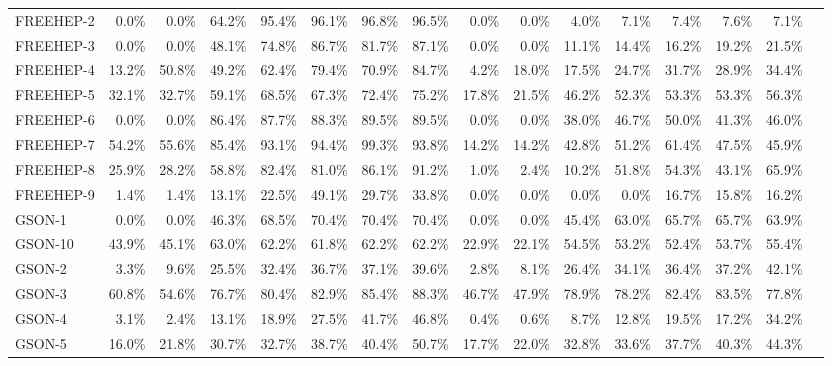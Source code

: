 \begin{tabular}{ l rrrrrrr rrrrrrrr}
FREEHEP-2 &  0.0\% &  0.0\% &  64.2\% &  95.4\% &  96.1\% &  96.8\% &  96.5\% &  0.0\% &  0.0\% &  4.0\% &  7.1\% &  7.4\% &  7.6\% &  7.1\%\\ 
FREEHEP-3 &  0.0\% &  0.0\% &  48.1\% &  74.8\% &  86.7\% &  81.7\% &  87.1\% &  0.0\% &  0.0\% &  11.1\% &  14.4\% &  16.2\% &  19.2\% &  21.5\%\\ 
FREEHEP-4 &  13.2\% &  50.8\% &  49.2\% &  62.4\% &  79.4\% &  70.9\% &  84.7\% &  4.2\% &  18.0\% &  17.5\% &  24.7\% &  31.7\% &  28.9\% &  34.4\%\\ 
FREEHEP-5 &  32.1\% &  32.7\% &  59.1\% &  68.5\% &  67.3\% &  72.4\% &  75.2\% &  17.8\% &  21.5\% &  46.2\% &  52.3\% &  53.3\% &  53.3\% &  56.3\%\\ 
FREEHEP-6 &  0.0\% &  0.0\% &  86.4\% &  87.7\% &  88.3\% &  89.5\% &  89.5\% &  0.0\% &  0.0\% &  38.0\% &  46.7\% &  50.0\% &  41.3\% &  46.0\%\\ 
FREEHEP-7 &  54.2\% &  55.6\% &  85.4\% &  93.1\% &  94.4\% &  99.3\% &  93.8\% &  14.2\% &  14.2\% &  42.8\% &  51.2\% &  61.4\% &  47.5\% &  45.9\%\\ 
FREEHEP-8 &  25.9\% &  28.2\% &  58.8\% &  82.4\% &  81.0\% &  86.1\% &  91.2\% &  1.0\% &  2.4\% &  10.2\% &  51.8\% &  54.3\% &  43.1\% &  65.9\%\\ 
FREEHEP-9 &  1.4\% &  1.4\% &  13.1\% &  22.5\% &  49.1\% &  29.7\% &  33.8\% &  0.0\% &  0.0\% &  0.0\% &  0.0\% &  16.7\% &  15.8\% &  16.2\%\\ 
GSON-1 &  0.0\% &  0.0\% &  46.3\% &  68.5\% &  70.4\% &  70.4\% &  70.4\% &  0.0\% &  0.0\% &  45.4\% &  63.0\% &  65.7\% &  65.7\% &  63.9\%\\ 
GSON-10 &  43.9\% &  45.1\% &  63.0\% &  62.2\% &  61.8\% &  62.2\% &  62.2\% &  22.9\% &  22.1\% &  54.5\% &  53.2\% &  52.4\% &  53.7\% &  55.4\%\\ 
GSON-2 &  3.3\% &  9.6\% &  25.5\% &  32.4\% &  36.7\% &  37.1\% &  39.6\% &  2.8\% &  8.1\% &  26.4\% &  34.1\% &  36.4\% &  37.2\% &  42.1\%\\ 
GSON-3 &  60.8\% &  54.6\% &  76.7\% &  80.4\% &  82.9\% &  85.4\% &  88.3\% &  46.7\% &  47.9\% &  78.9\% &  78.2\% &  82.4\% &  83.5\% &  77.8\%\\ 
GSON-4 &  3.1\% &  2.4\% &  13.1\% &  18.9\% &  27.5\% &  41.7\% &  46.8\% &  0.4\% &  0.6\% &  8.7\% &  12.8\% &  19.5\% &  17.2\% &  34.2\%\\ 
GSON-5 &  16.0\% &  21.8\% &  30.7\% &  32.7\% &  38.7\% &  40.4\% &  50.7\% &  17.7\% &  22.0\% &  32.8\% &  33.6\% &  37.7\% &  40.3\% &  44.3\%\\ 

\end{tabular}
